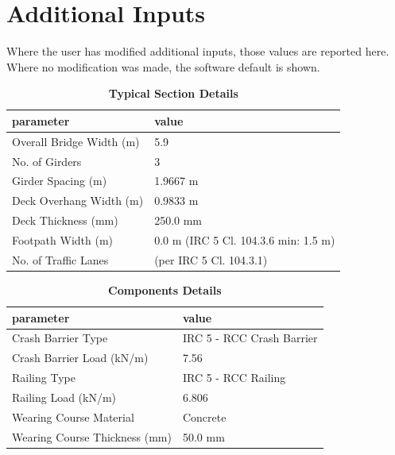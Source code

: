 \documentclass[12pt,a4paper]{report}
\numberwithin{table}{chapter}
\numberwithin{figure}{chapter}
\begin{document}
\newpage
\section{Additional Inputs}
\label{sec:additional-inputs}

Where the user has modified additional inputs, those values are reported here. Where no modification was made, the software default is shown.

\vspace{0.8cm}

\begin{longtable}{|L{5.5cm}|p{10.0cm}|}
\caption{\textbf{Typical Section Details}}
\hline
\textbf{parameter} & \textbf{value} \\
\hline
\textnormal{Overall Bridge Width (m)} & 5.9 \\[6pt]
\hline
\textnormal{No. of Girders} & 3 \\[6pt]
\hline
\textnormal{Girder Spacing (m)} & 1.9667 m \\[6pt]
\hline
\textnormal{Deck Overhang Width (m)} & 0.9833 m \\[6pt]
\hline
\textnormal{Deck Thickness (mm)} & 250.0 mm \\[6pt]
\hline
\textnormal{Footpath Width (m)} & 0.0 m (IRC 5 Cl. 104.3.6 min: 1.5 m) \\[6pt]
\hline
\textnormal{No. of Traffic Lanes} &  (per IRC 5 Cl. 104.3.1) \\[6pt]
\hline
\end{longtable}

\vspace{0.8em}

\begin{longtable}{|L{5.5cm}|p{10.0cm}|}
\caption{\textbf{Components Details}}
\hline
\textbf{parameter} & \textbf{value} \\
\hline
\textnormal{Crash Barrier Type} & IRC 5 - RCC Crash Barrier \\[6pt]
\hline
\textnormal{Crash Barrier Load (kN/m)} & 7.56 \\[6pt]
\hline

\textnormal{Railing Type} & IRC 5 - RCC Railing \\[6pt]
\hline
\textnormal{Railing Load (kN/m)} & 6.806 \\[6pt]
\hline
\textnormal{Wearing Course Material} & Concrete \\[6pt]
\hline
\textnormal{Wearing Course Thickness (mm)} & 50.0 mm \\[6pt]
\hline
\end{longtable}
\end{document}
